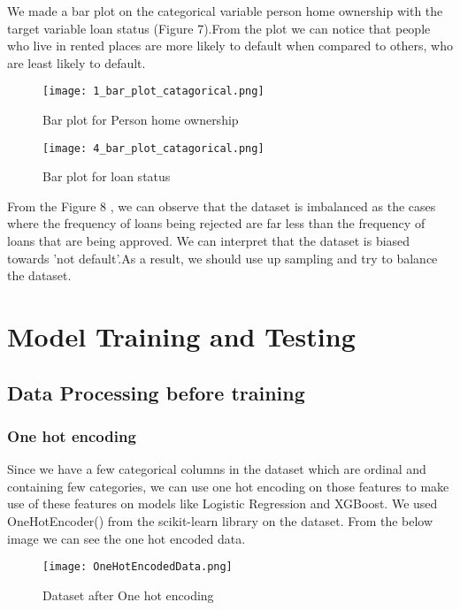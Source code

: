 \documentclass[12pt]{article}
\begin{document}
We made a bar plot on the categorical variable person home ownership with the target variable loan status (Figure 7).From the plot we can notice that people who live in rented places are more likely to default when compared to others, who are least likely to default.
\begin{figure}[!h] %
\centering
\texttt{[image: 1\_bar\_plot\_catagorical.png]}
\caption{Bar plot for Person home ownership}
\end{figure}
 
 
 \begin{figure}[!h] %
\centering
\texttt{[image: 4\_bar\_plot\_catagorical.png]}
\caption{Bar plot for loan status}
\end{figure}
 From the Figure 8 , we can observe that the dataset is imbalanced as the cases where the frequency of loans being rejected are far less than the frequency of loans that are being approved. We can interpret that the dataset is biased towards 'not default'.As a result, we should use up sampling and try to balance the dataset.

\section{Model Training and Testing}

\subsection{Data Processing before training}
\subsubsection{One hot encoding}
Since we have a few categorical columns in the dataset which are ordinal and containing few categories, we can use one hot encoding on those features to make use of these features on models like Logistic Regression and XGBoost. We used OneHotEncoder() from the scikit-learn library on the dataset. From the below image we can see the one hot encoded data.
\begin{figure}[h] %
\centering
\texttt{[image: OneHotEncodedData.png]}
\caption{Dataset after One hot encoding}
\end{figure}
\end{document}
